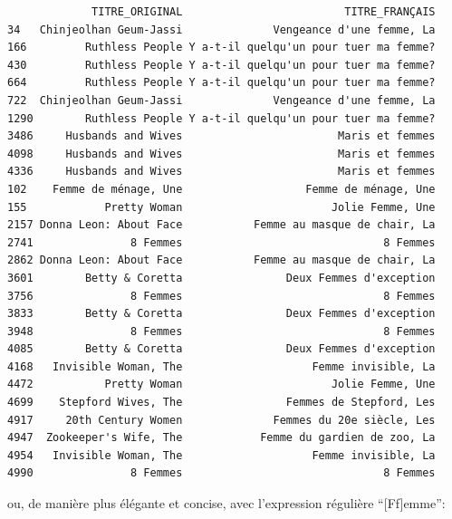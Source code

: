 \documentclass[
  letterpaper,
  DIV=11,
  numbers=noendperiod]{scrartcl}
\newenvironment{Shaded}{\begin{snugshade}}{\end{snugshade}}
\newcommand{\AttributeTok}[1]{\textcolor[rgb]{0.40,0.45,0.13}{#1}}
\newcommand{\FunctionTok}[1]{\textcolor[rgb]{0.28,0.35,0.67}{#1}}
\newcommand{\NormalTok}[1]{\textcolor[rgb]{0.00,0.23,0.31}{#1}}
\newcommand{\SpecialCharTok}[1]{\textcolor[rgb]{0.37,0.37,0.37}{#1}}
\newcommand{\StringTok}[1]{\textcolor[rgb]{0.13,0.47,0.30}{#1}}
\begin{document}
\begin{verbatim}
             TITRE_ORIGINAL                         TITRE_FRANÇAIS
34   Chinjeolhan Geum-Jassi              Vengeance d'une femme, La
166         Ruthless People Y a-t-il quelqu'un pour tuer ma femme?
430         Ruthless People Y a-t-il quelqu'un pour tuer ma femme?
664         Ruthless People Y a-t-il quelqu'un pour tuer ma femme?
722  Chinjeolhan Geum-Jassi              Vengeance d'une femme, La
1290        Ruthless People Y a-t-il quelqu'un pour tuer ma femme?
3486     Husbands and Wives                        Maris et femmes
4098     Husbands and Wives                        Maris et femmes
4336     Husbands and Wives                        Maris et femmes
102    Femme de ménage, Une                   Femme de ménage, Une
155            Pretty Woman                       Jolie Femme, Une
2157 Donna Leon: About Face           Femme au masque de chair, La
2741               8 Femmes                               8 Femmes
2862 Donna Leon: About Face           Femme au masque de chair, La
3601        Betty & Coretta                Deux Femmes d'exception
3756               8 Femmes                               8 Femmes
3833        Betty & Coretta                Deux Femmes d'exception
3948               8 Femmes                               8 Femmes
4085        Betty & Coretta                Deux Femmes d'exception
4168   Invisible Woman, The                    Femme invisible, La
4472           Pretty Woman                       Jolie Femme, Une
4699    Stepford Wives, The                Femmes de Stepford, Les
4917     20th Century Women              Femmes du 20e siècle, Les
4947  Zookeeper's Wife, The            Femme du gardien de zoo, La
4954   Invisible Woman, The                    Femme invisible, La
4990               8 Femmes                               8 Femmes
\end{verbatim}

ou, de manière plus élégante et concise, avec l'expression régulière
``{[}Ff{]}emme'':

\begin{Shaded}
\end{Shaded}
\end{document}

